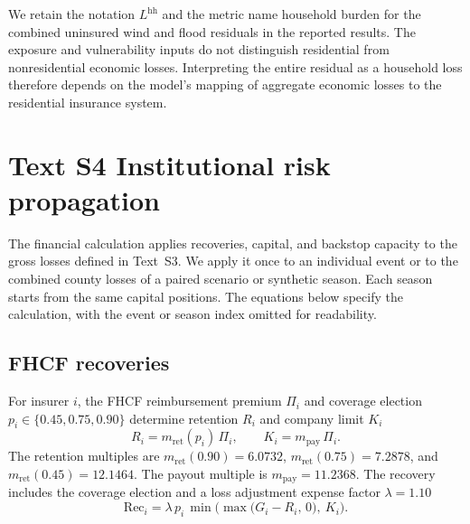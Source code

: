 We retain the notation $L^{\mathrm{hh}}$ and the metric name household burden for the combined uninsured wind and flood residuals in the reported results. The exposure and vulnerability inputs do not distinguish residential from nonresidential economic losses. Interpreting the entire residual as a household loss therefore depends on the model's mapping of aggregate economic losses to the residential insurance system.

\section*{Text S4 Institutional risk propagation}\label{TextS4}\label{MethodsRiskProp}
The financial calculation applies recoveries, capital, and backstop capacity to the gross losses defined in Text~S3. We apply it once to an individual event or to the combined county losses of a paired scenario or synthetic season. Each season starts from the same capital positions. The equations below specify the calculation, with the event or season index omitted for readability.

\subsection*{FHCF recoveries}
For insurer $i$, the FHCF reimbursement premium $\Pi_i$ and coverage election $p_i\in\{0.45,0.75,0.90\}$ determine retention $R_i$ and company limit $K_i$
\begin{equation}
R_i = m_{\mathrm{ret}}(p_i)\,\Pi_i,
\qquad
K_i = m_{\mathrm{pay}}\,\Pi_i.
\end{equation}
The retention multiples are $m_{\mathrm{ret}}(0.90)=6.0732$, $m_{\mathrm{ret}}(0.75)=7.2878$, and $m_{\mathrm{ret}}(0.45)=12.1464$. The payout multiple is $m_{\mathrm{pay}}=11.2368$. The recovery includes the coverage election and a loss adjustment expense factor $\lambda=1.10$
\begin{equation}
\mathrm{Rec}_i = \lambda\, p_i\, \min\!\Big(\max\big(G_i - R_i,\,0\big),\ K_i\Big).
\label{eq:fhcf}
\end{equation}

